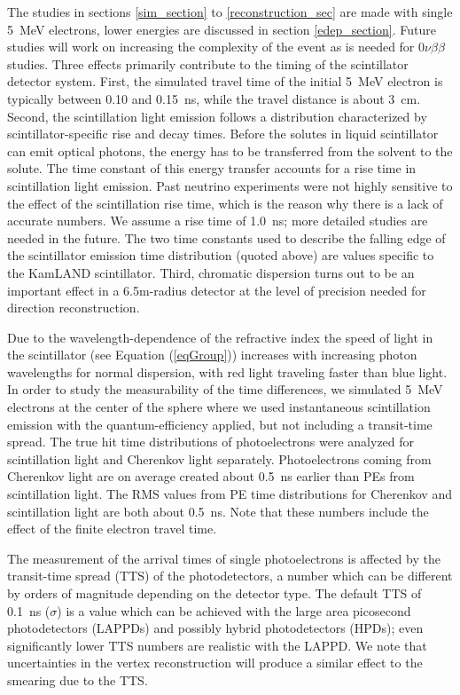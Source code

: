 \documentclass[cits]{JINST}
\begin{document}
The studies in sections \ref{sim_section} to \ref{reconstruction_sec} are made with single 5~MeV electrons, lower energies are
discussed in section \ref{edep_section}. Future studies will work on increasing the complexity
of the event as is needed for $0\nu\beta\beta$ studies. Three
effects primarily contribute to the timing of the scintillator detector
system. First, the simulated travel time of the initial 5~MeV electron is typically between
0.10 and 0.15~ns, while the travel distance is about 3~cm. Second, the
scintillation light emission follows a distribution characterized by
scintillator-specific rise and decay times. Before the solutes in
liquid scintillator can emit optical photons, the energy has to be
transferred from the solvent to the solute. The time constant of this
energy transfer accounts for a rise time in scintillation light
emission. Past neutrino experiments were not highly sensitive to the
effect of the scintillation rise time, which is the reason why there
is a lack of accurate numbers. We assume a rise time of 1.0~ns; more
detailed studies are needed in the future. The two time constants used
to describe the falling edge of the scintillator emission time
distribution (quoted above) are values specific to the KamLAND
scintillator. Third, chromatic dispersion turns out to be an important
effect in a 6.5m-radius detector at the level of precision needed for
direction reconstruction.

Due to the wavelength-dependence of the refractive index the speed of
light in the scintillator (see Equation (\ref{eqGroup})) increases
with increasing photon wavelengths for normal dispersion, with red
light traveling faster than blue light.  In order to study the
measurability of the time differences, we simulated 5~MeV electrons at
the center of the sphere where we used instantaneous scintillation
emission with the quantum-efficiency applied, but not including a
transit-time spread. The true hit time distributions of photoelectrons
were analyzed for scintillation light and Cherenkov light
separately. Photoelectrons coming from Cherenkov light are on average
created about 0.5~ns earlier than PEs from scintillation light. The
RMS values from PE time distributions for Cherenkov and scintillation
light are both about 0.5~ns. Note that these numbers include the
effect of the finite electron travel time.

The measurement of the arrival times of single photoelectrons is
affected by the transit-time spread (TTS) of the photodetectors, a
number which can be different by orders of magnitude depending on the
detector type. The default TTS of 0.1~ns ($\sigma$) is a value which
can be achieved with the large area picosecond photodetectors
(LAPPDs)\cite{LAPPDSum,LAPPDTDR} and possibly hybrid photodetectors
(HPDs)\cite{hpdThesis}; even significantly lower TTS numbers are
realistic with the LAPPD\cite{RSI_paper,PSEC4_paper,anode_paper}. We
note that uncertainties in the vertex reconstruction will produce a
similar effect to the smearing due to the TTS.
\end{document}
